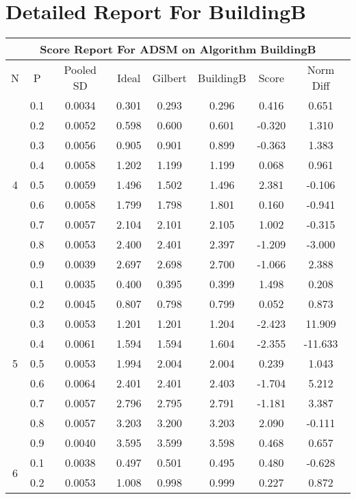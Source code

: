 \documentclass[11pt,a4paper]{report}
\begin{document}
\chapter{Detailed Report For BuildingB}
\begin{longtable}{ | c | c || c | c | c | c | c | c | }
\hline
\multicolumn{8}{|c|}{ Score Report For ADSM on Algorithm BuildingB} \\
\hline
N & P & Pooled SD &  Ideal &  Gilbert & BuildingB  & Score & Norm Diff \\
 \hline
 \hline
 \endhead
\multirow{9}{*}{4} & 0.1 & 0.0034 & 0.301 & 0.293 & 0.296 & 0.416 & 0.651 \\
 & 0.2 & 0.0052 & 0.598 & 0.600 & 0.601 & -0.320 & 1.310 \\
 & 0.3 & 0.0056 & 0.905 & 0.901 & 0.899 & -0.363 & 1.383 \\
 & 0.4 & 0.0058 & 1.202 & 1.199 & 1.199 & 0.068 & 0.961 \\
 & 0.5 & 0.0059 & 1.496 & 1.502 & 1.496 & 2.381 & -0.106 \\
 & 0.6 & 0.0058 & 1.799 & 1.798 & 1.801 & 0.160 & -0.941 \\
 & 0.7 & 0.0057 & 2.104 & 2.101 & 2.105 & 1.002 & -0.315 \\
 & 0.8 & 0.0053 & 2.400 & 2.401 & 2.397 & -1.209 & -3.000 \\
 & 0.9 & 0.0039 & 2.697 & 2.698 & 2.700 & -1.066 & 2.388 \\
 \hline
\multirow{9}{*}{5} & 0.1 & 0.0035 & 0.400 & 0.395 & 0.399 & 1.498 & 0.208 \\
 & 0.2 & 0.0045 & 0.807 & 0.798 & 0.799 & 0.052 & 0.873 \\
 & 0.3 & 0.0053 & 1.201 & 1.201 & 1.204 & -2.423 & 11.909 \\
 & 0.4 & 0.0061 & 1.594 & 1.594 & 1.604 & -2.355 & -11.633 \\
 & 0.5 & 0.0053 & 1.994 & 2.004 & 2.004 & 0.239 & 1.043 \\
 & 0.6 & 0.0064 & 2.401 & 2.401 & 2.403 & -1.704 & 5.212 \\
 & 0.7 & 0.0057 & 2.796 & 2.795 & 2.791 & -1.181 & 3.387 \\
 & 0.8 & 0.0057 & 3.203 & 3.200 & 3.203 & 2.090 & -0.111 \\
 & 0.9 & 0.0040 & 3.595 & 3.599 & 3.598 & 0.468 & 0.657 \\
 \hline
\multirow{9}{*}{6} & 0.1 & 0.0038 & 0.497 & 0.501 & 0.495 & 0.480 & -0.628 \\
 & 0.2 & 0.0053 & 1.008 & 0.998 & 0.999 & 0.227 & 0.872 \\

\end{longtable}
\end{document}
